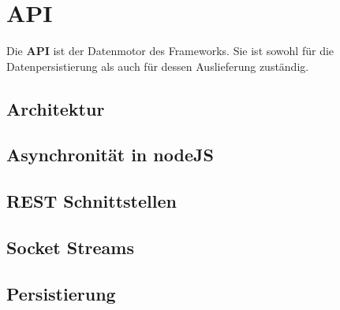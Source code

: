 %
%
%
%

\section{API}

Die \textbf{API} ist der Datenmotor des Frameworks. Sie ist sowohl für die Datenpersistierung als auch für dessen Auslieferung zuständig.

\subsection{Architektur}

\subsection{Asynchronität in nodeJS}

\subsection{REST Schnittstellen}

\subsection{Socket Streams}

\subsection{Persistierung}
